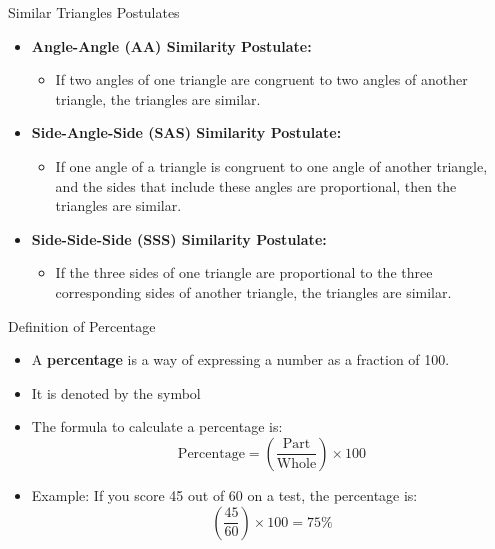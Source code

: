 \documentclass{beamer}
\begin{document}
\begin{frame}{Similar Triangles Postulates}
    \begin{itemize}
        \item \textbf{Angle-Angle (AA) Similarity Postulate:} 
        \begin{itemize}
            \item If two angles of one triangle are congruent to two angles of another triangle, the triangles are similar.
        \end{itemize}

        \item \textbf{Side-Angle-Side (SAS) Similarity Postulate:} 
        \begin{itemize}
            \item If one angle of a triangle is congruent to one angle of another triangle, and the sides that include these angles are proportional, then the triangles are similar.
        \end{itemize}

        \item \textbf{Side-Side-Side (SSS) Similarity Postulate:} 
        \begin{itemize}
            \item If the three sides of one triangle are proportional to the three corresponding sides of another triangle, the triangles are similar.
        \end{itemize}
    \end{itemize}
    
\end{frame}



\begin{frame}{Definition of Percentage}
    \begin{itemize}
        \item A \textbf{percentage} is a way of expressing a number as a fraction of 100.
        \item It is denoted by the symbol 
        \item The formula to calculate a percentage is:
    \[
        \text{Percentage} = \left( \frac{\text{Part}}{\text{Whole}} \right) \times 100
    \]
        \item Example: If you score 45 out of 60 on a test, the percentage is:
    \[
        \left( \frac{45}{60} \right) \times 100 = 75\%
    \]
    \end{itemize}
\end{frame}
\end{document}
